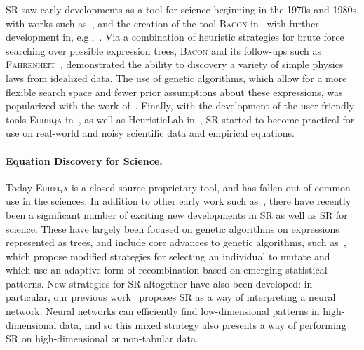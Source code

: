 \documentclass[letterpaper,twocolumn]{scrartcl}
\newcommand\eureqa{\textsc{Eureqa}\xspace}
\begin{document}
SR saw early developments 
as a tool for science beginning in the 1970s and 1980s, with works such as~\cite{gerwinInformationProcessingData1974}, and the creation of the tool \textsc{Bacon} in~\cite{langleyBACONProductionSystem1977} with further development in, e.g.,~\cite{langleyRediscoveringPhysicsBACON1979,langleyBACONDiscoveryConservation1981}.
Via a combination of heuristic strategies for brute force searching over possible expression trees, \textsc{Bacon} and its follow-ups such as \textsc{Fahrenheit}~\cite{langleyDatadrivenApproachesEmpirical1989}, demonstrated the ability to discovery a variety of simple physics laws from idealized data.
The use of genetic algorithms, which allow for a more flexible search space and fewer prior assumptions about these expressions, was popularized with the work of~\cite{kozaGeneticProgrammingMeans1994}.
Finally, with the development of the user-friendly tools \eureqa in~\cite{bongardCoverAutomatedReverse2007,schmidtDistillingFreeFormNatural2009,schmidtSymbolicRegressionImplicit2010}, as well as HeuristicLab in~\cite{wagnerHeuristicLabGenericExtensible2005}, SR started to become practical for use on real-world and noisy scientific data and empirical equations.

\paragraph{Equation Discovery for Science.} 
Today \eureqa is a closed-source proprietary tool, and has fallen out of common use in the sciences.
In addition to other early work such as~\cite{debFastElitistNondominated2000,debFastElitistMultiobjective2002,davidsonSymbolicNumericalRegression2003,cranmerPhysicsGPGeneticProgramming2005},
there have recently been a significant number of exciting new developments in SR as well as SR for science.
These have largely been focused on genetic algorithms on expressions represented as trees, and include core advances to genetic algorithms, such as~\cite{lacavaEpsilonLexicaseSelectionRegression2016,lacavaProbabilisticMultiobjectiveAnalysis2018}, which propose modified strategies for selecting an individual to mutate and~\cite{virgolinScalableGeneticProgramming2017,virgolinImprovingModelbasedGenetic2021} which use an adaptive form of recombination based on emerging statistical patterns.
New strategies for SR altogether have also been developed:
in particular, our previous work~\cite{cranmerLearningSymbolicPhysics2019,cranmerDiscoveringSymbolicModels2020,cranmerDisentangledSparsityNetworks2021} proposes SR as a way of interpreting a neural network.
Neural networks can efficiently find low-dimensional patterns in high-dimensional data, and so this mixed strategy also presents a way of performing SR on high-dimensional or non-tabular data.
\end{document}
